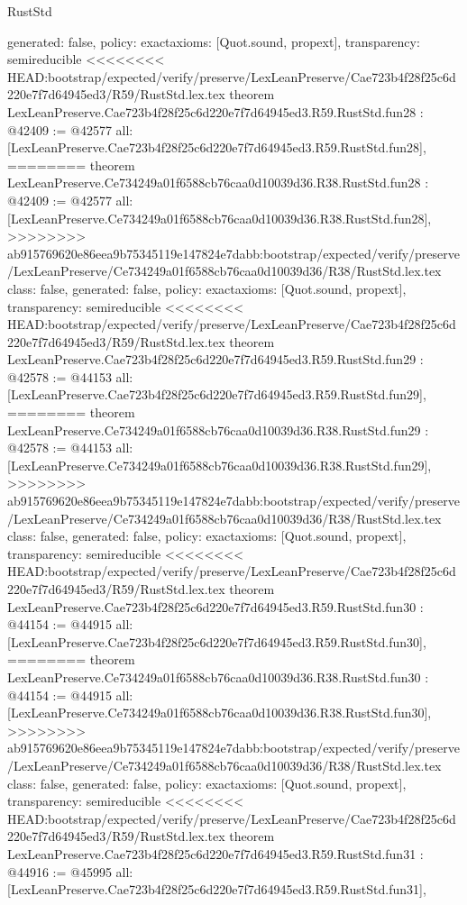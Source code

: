 \begin{lexlean}{RustStd}
\begin{coremodule}
{\begin{coremodule}
{{{{{{{{{{{{{{{{{{{{{{{{{{{{{{{  generated: false,
  policy: exact{axioms: [Quot.sound, propext]},
  transparency: semireducible
}
<<<<<<<< HEAD:bootstrap/expected/verify/preserve/LexLeanPreserve/Cae723b4f28f25c6d220e7f7d64945ed3/R59/RustStd.lex.tex
theorem LexLeanPreserve.Cae723b4f28f25c6d220e7f7d64945ed3.R59.RustStd.fun28 : @42409 := @42577 {
  all: [LexLeanPreserve.Cae723b4f28f25c6d220e7f7d64945ed3.R59.RustStd.fun28],
========
theorem LexLeanPreserve.Ce734249a01f6588cb76caa0d10039d36.R38.RustStd.fun28 : @42409 := @42577 {
  all: [LexLeanPreserve.Ce734249a01f6588cb76caa0d10039d36.R38.RustStd.fun28],
>>>>>>>> ab915769620e86eea9b75345119e147824e7dabb:bootstrap/expected/verify/preserve/LexLeanPreserve/Ce734249a01f6588cb76caa0d10039d36/R38/RustStd.lex.tex
  class: false,
  generated: false,
  policy: exact{axioms: [Quot.sound, propext]},
  transparency: semireducible
}
<<<<<<<< HEAD:bootstrap/expected/verify/preserve/LexLeanPreserve/Cae723b4f28f25c6d220e7f7d64945ed3/R59/RustStd.lex.tex
theorem LexLeanPreserve.Cae723b4f28f25c6d220e7f7d64945ed3.R59.RustStd.fun29 : @42578 := @44153 {
  all: [LexLeanPreserve.Cae723b4f28f25c6d220e7f7d64945ed3.R59.RustStd.fun29],
========
theorem LexLeanPreserve.Ce734249a01f6588cb76caa0d10039d36.R38.RustStd.fun29 : @42578 := @44153 {
  all: [LexLeanPreserve.Ce734249a01f6588cb76caa0d10039d36.R38.RustStd.fun29],
>>>>>>>> ab915769620e86eea9b75345119e147824e7dabb:bootstrap/expected/verify/preserve/LexLeanPreserve/Ce734249a01f6588cb76caa0d10039d36/R38/RustStd.lex.tex
  class: false,
  generated: false,
  policy: exact{axioms: [Quot.sound, propext]},
  transparency: semireducible
}
<<<<<<<< HEAD:bootstrap/expected/verify/preserve/LexLeanPreserve/Cae723b4f28f25c6d220e7f7d64945ed3/R59/RustStd.lex.tex
theorem LexLeanPreserve.Cae723b4f28f25c6d220e7f7d64945ed3.R59.RustStd.fun30 : @44154 := @44915 {
  all: [LexLeanPreserve.Cae723b4f28f25c6d220e7f7d64945ed3.R59.RustStd.fun30],
========
theorem LexLeanPreserve.Ce734249a01f6588cb76caa0d10039d36.R38.RustStd.fun30 : @44154 := @44915 {
  all: [LexLeanPreserve.Ce734249a01f6588cb76caa0d10039d36.R38.RustStd.fun30],
>>>>>>>> ab915769620e86eea9b75345119e147824e7dabb:bootstrap/expected/verify/preserve/LexLeanPreserve/Ce734249a01f6588cb76caa0d10039d36/R38/RustStd.lex.tex
  class: false,
  generated: false,
  policy: exact{axioms: [Quot.sound, propext]},
  transparency: semireducible
}
<<<<<<<< HEAD:bootstrap/expected/verify/preserve/LexLeanPreserve/Cae723b4f28f25c6d220e7f7d64945ed3/R59/RustStd.lex.tex
theorem LexLeanPreserve.Cae723b4f28f25c6d220e7f7d64945ed3.R59.RustStd.fun31 : @44916 := @45995 {
  all: [LexLeanPreserve.Cae723b4f28f25c6d220e7f7d64945ed3.R59.RustStd.fun31],
}}}}}}}}}}}}}}}}}}}}}}}}}}}}}}}}}}
\end{coremodule}}
\end{coremodule}
\end{lexlean}
